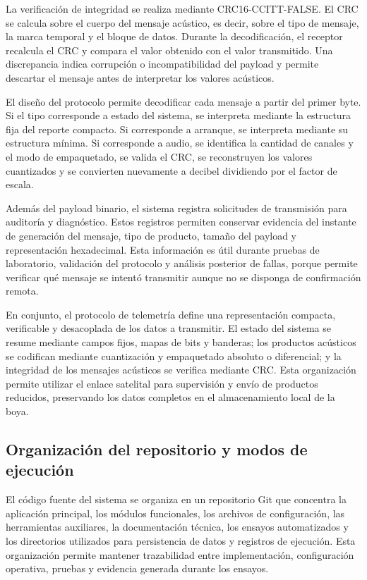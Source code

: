 La verificación de integridad se realiza mediante CRC16-CCITT-FALSE. El CRC se calcula sobre el cuerpo del mensaje acústico, es decir, sobre el tipo de mensaje, la marca temporal y el bloque de datos. Durante la decodificación, el receptor recalcula el CRC y compara el valor obtenido con el valor transmitido. Una discrepancia indica corrupción o incompatibilidad del payload y permite descartar el mensaje antes de interpretar los valores acústicos.

El diseño del protocolo permite decodificar cada mensaje a partir del primer byte. Si el tipo corresponde a estado del sistema, se interpreta mediante la estructura fija del reporte compacto. Si corresponde a arranque, se interpreta mediante su estructura mínima. Si corresponde a audio, se identifica la cantidad de canales y el modo de empaquetado, se valida el CRC, se reconstruyen los valores cuantizados y se convierten nuevamente a decibel dividiendo por el factor de escala.

Además del payload binario, el sistema registra solicitudes de transmisión para auditoría y diagnóstico. Estos registros permiten conservar evidencia del instante de generación del mensaje, tipo de producto, tamaño del payload y representación hexadecimal. Esta información es útil durante pruebas de laboratorio, validación del protocolo y análisis posterior de fallas, porque permite verificar qué mensaje se intentó transmitir aunque no se disponga de confirmación remota.

En conjunto, el protocolo de telemetría define una representación compacta, verificable y desacoplada de los datos a transmitir. El estado del sistema se resume mediante campos fijos, mapas de bits y banderas; los productos acústicos se codifican mediante cuantización y empaquetado absoluto o diferencial; y la integridad de los mensajes acústicos se verifica mediante CRC. Esta organización permite utilizar el enlace satelital para supervisión y envío de productos reducidos, preservando los datos completos en el almacenamiento local de la boya.

\subsection{Organización del repositorio y modos de ejecución}
\label{subsec:repositorio-modos-ejecucion}

El código fuente del sistema se organiza en un repositorio Git que concentra la aplicación principal, los módulos funcionales, los archivos de configuración, las herramientas auxiliares, la documentación técnica, los ensayos automatizados y los directorios utilizados para persistencia de datos y registros de ejecución. Esta organización permite mantener trazabilidad entre implementación, configuración operativa, pruebas y evidencia generada durante los ensayos.

